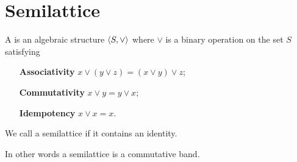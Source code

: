 \section{Semilattice}
\begin{definition}
A  is an algebraic structure $\langle S,\vee \rangle$ where $\vee$ is a binary operation on the set $S$ satisfying
\begin{itemize}[leftmargin=2.5cm]
\item[\textbf{Associativity}] $x\vee (y\vee z) = (x\vee y) \vee z$;
\item[\textbf{Commutativity}] $x \vee y = y \vee x$;
\item[\textbf{Idempotency}] $x\vee x = x$.
\end{itemize}
We call a semilattice  if it contains an identity.
\end{definition}
In other words a semilattice is a commutative band.

